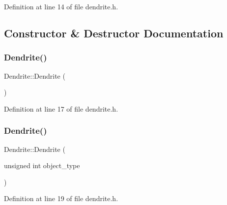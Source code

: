 Definition at line 14 of file dendrite.\+h.



\subsection{Constructor \& Destructor Documentation}
\mbox{\label{class_dendrite_a0a35047fcf3dad2f81be348499e32337}} 
\subsubsection{\texorpdfstring{Dendrite()}{Dendrite()}\hspace{0.1cm}{\footnotesize\ttfamily [1/4]}}
{\footnotesize\ttfamily Dendrite\+::\+Dendrite (\begin{DoxyParamCaption}{ }\end{DoxyParamCaption})\hspace{0.3cm}{\ttfamily [inline]}}



Definition at line 17 of file dendrite.\+h.

\mbox{\label{class_dendrite_ae702e9fd351be8dc3a09afa0ed431c3b}} 
\subsubsection{\texorpdfstring{Dendrite()}{Dendrite()}\hspace{0.1cm}{\footnotesize\ttfamily [2/4]}}
{\footnotesize\ttfamily Dendrite\+::\+Dendrite (\begin{DoxyParamCaption}\item[{unsigned int}]{object\+\_\+type }\end{DoxyParamCaption})\hspace{0.3cm}{\ttfamily [inline]}}



Definition at line 19 of file dendrite.\+h.

\mbox{\label{class_dendrite_a10313257362c8f62c8b01a9992ec9ff7}} 
